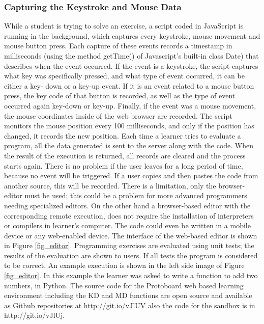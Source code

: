 \documentclass[conference]{IEEEtran}
\begin{document}
\subsubsection{Capturing the Keystroke and Mouse Data} 
While a student is trying
to solve an exercise, a script coded in JavaScript is running in the background,
which captures every keystroke, mouse movement and mouse button press. Each
capture of these events records a timestamp in milliseconds (using the method
getTime() of Javascript's built-in class Date) that describes when the event
occurred. If the event is a keystroke, the script captures what key was
specifically pressed, and what type of event occurred, it can be either a key-
down or a key-up event. If it is an event related to a mouse button press, the
key code of that button is recorded, as well as the type of event occurred again
key-down or key-up. Finally, if the event was a mouse movement, the mouse
coordinates inside of the web browser are recorded. The script monitors the
mouse position every 100 milliseconds, and only if the position has changed, it
records the new position. Each time a learner tries to evaluate a program, all
the data generated is sent to the server along with the code. When the result of
the execution is returned, all records are cleared and the process starts again.
There is no problem if the user leaves for a long period of time, because no
event will be triggered. If a user copies and then pastes the code from another
source, this will be recorded. There is a limitation, only the browser-editor
must be used; this could be a problem for more advanced programmers needing
specialized editors.  On the other hand a browser-based editor with the
corresponding remote execution, does not require the installation of
interpreters or compilers in learner’s computer. The code could even be written
in a mobile device or any web-enabled device.  The interface of the web-based
editor is shown in Figure \ref{fig_editor}. Programming exercises are evaluated using unit
tests; the results of the evaluation are shown to users. If all tests the
program is considered to be correct. An example execution is shown in the left
side image of Figure \ref{fig_editor}. In this example the learner was asked to write a
function to add two numbers, in Python. The source code for the Protoboard web
based learning environment including the KD and MD functions are open source and
available as Github repositories at http://git.io/vJlUV also the code for the
sandbox is in http://git.io/vJlUj. %
\end{document}
